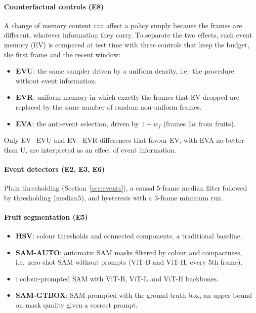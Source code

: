 \paragraph{Counterfactual controls (E8)} A change of memory content can affect a policy simply because the frames are different, whatever information they carry. To separate the two effects, each event memory (EV) is compared at test time with three controls that keep the budget, the first frame and the recent window:
\begin{itemize}
\item \textbf{EVU}: the same sampler driven by a uniform density, i.e.\ the procedure without event information.
\item \textbf{EVR}: uniform memory in which exactly the frames that EV dropped are replaced by the same number of random non-uniform frames.
\item \textbf{EVA}: the anti-event selection, driven by $1-w_f$ (frames far from fruits).
\end{itemize}
Only EV$-$EVU and EV$-$EVR differences that favour EV, with EVA no better than U, are interpreted as an effect of event information.

\paragraph{Event detectors (E2, E3, E6)} Plain thresholding (Section~\ref{sec:events}), a causal 5-frame median filter followed by thresholding (median5), and hysteresis with a 3-frame minimum run.

\paragraph{Fruit segmentation (E5)}
\begin{itemize}
\item \textbf{HSV}: colour thresholds and connected components, a traditional baseline.
\item \textbf{SAM-AUTO}: automatic SAM masks filtered by colour and compactness, i.e.\ zero-shot SAM without prompts (ViT-B and ViT-H, every 5th frame).
\item \textbf{\fdm}: colour-prompted SAM with ViT-B, ViT-L and ViT-H backbones.
\item \textbf{SAM-GTBOX}: SAM prompted with the ground-truth box, an upper bound on mask quality given a correct prompt.
\end{itemize}

